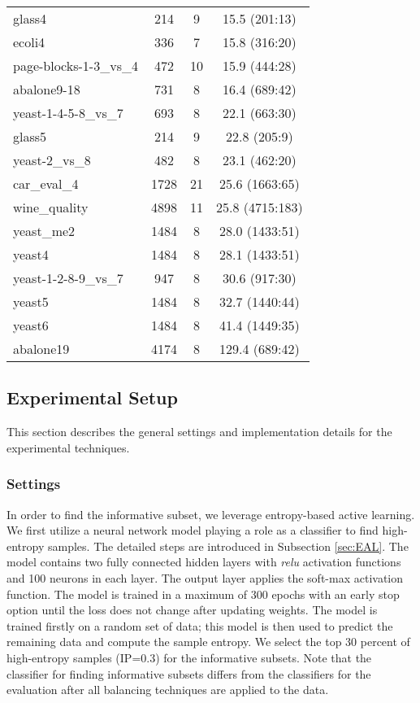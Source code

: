 \begin{table}[htbp]
\begin{tabular}{lccc}
		glass4 & 214   & 9     & 15.5 (201:13)\\
		ecoli4 & 336   & 7     & 15.8 (316:20)\\
		page-blocks-1-3\_vs\_4 & 472   & 10    & 15.9 (444:28)\\
		abalone9-18 & 731   & 8     & 16.4 (689:42)\\
		yeast-1-4-5-8\_vs\_7 & 693   & 8     & 22.1 (663:30)\\
		glass5 & 214   & 9     & 22.8 (205:9)\\
		yeast-2\_vs\_8 & 482   & 8     & 23.1 (462:20)\\
		car\_eval\_4 & 1728  & 21    & 25.6 (1663:65)\\
		wine\_quality & 4898  & 11    & 25.8 (4715:183)\\
		yeast\_me2 & 1484  & 8     & 28.0 (1433:51)\\
		yeast4 & 1484  & 8     & 28.1 (1433:51)\\
		yeast-1-2-8-9\_vs\_7 & 947   & 8     & 30.6 (917:30)\\
		yeast5 & 1484  & 8     & 32.7 (1440:44)\\
		yeast6 & 1484  & 8     & 41.4 (1449:35)\\
		abalone19 & 4174  & 8     & 129.4 (689:42)\\
	\end{tabular}%
	\label{tab:dataDecription}%
\end{table}%



\subsection{Experimental Setup}
This section describes the general settings and implementation details for the experimental techniques.


\subsubsection{\Methodname{} Settings}
In order to find the informative subset, we leverage entropy-based active learning. We first utilize a neural network model playing a role as a classifier to find high-entropy samples. The detailed steps are introduced in Subsection \ref{sec:EAL}. The model contains two fully connected hidden layers with \textit{relu} activation functions and 100 neurons in each layer. The output layer applies the soft-max activation function. The model is trained in a maximum of 300 epochs with an early stop option until the loss does not change after updating weights. The model is trained firstly on a random set of data; this model is then used to predict the remaining data and compute the sample entropy. We select the top 30 percent of high-entropy samples (IP=0.3) for the informative subsets. Note that the classifier for finding informative subsets differs from the classifiers for the evaluation after all balancing techniques are applied to the data.  

